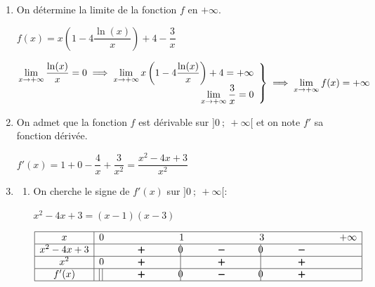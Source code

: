 \documentclass[10pt]{article}
\providecommand{\ds}{\displaystyle}
\begin{document}
\begin{enumerate}
\item On détermine la limite de la fonction $f$ en $+\infty$.

$f(x) = x\left ( 1- 4\dfrac{\ln(x)}{x}\right ) + 4 -  \dfrac{3}{x}$

$\left.
\begin{array}{@{} r}
\ds\lim_{x\to +\infty} \dfrac{\ln(x)}{x} = 0 \implies \ds\lim_{x\to +\infty}  x\left ( 1- 4\dfrac{\ln(x)}{x}\right ) + 4 = +\infty\\
\ds\lim_{x\to +\infty} \dfrac{3}{x}= 0
\end{array}
\right \rbrace
\implies
\ds\lim_{x\to +\infty} f(x) = +\infty$

\item On admet que la fonction $f$ est dérivable sur $]0~;~ +\infty[$ et on note $f'$ sa fonction dérivée.


$f'(x)= 1 + 0 - \dfrac{4}{x} +\dfrac{3}{x^2} = \dfrac{x^2 - 4x +3}{x^2}$

\item
	\begin{enumerate}
		\item 
		



On cherche le signe de $f'(x)$ sur $]0~;~+\infty[$:

$x^2-4x+3 = (x-1)(x-3)$

\begin{center}
{
\renewcommand{\arraystretch}{1.5}
\def\esp{\hspace*{2cm}}
$\begin{array}{|c | l *{6}{c} |} 
\hline
x  & 0 & \esp & 1 & \esp & 3 & \esp & +\infty \\
\hline
x^2-4x+3 &  & \pmb{+} &  \vline\hspace{-2.7pt}{0} & \pmb{-} & \vline\hspace{-2.7pt}{0} & \pmb{-} &\\
\hline
x^2 & 0  & \pmb{+} &  \vline\hspace{-2.7pt}{\phantom 0} & \pmb{+} & \vline\hspace{-2.7pt}{\phantom 0} & \pmb{+} &\\
\hline
f'(x) & \vline\;\vline  & \pmb{+} &  \vline\hspace{-2.7pt}{0} & \pmb{-} & \vline\hspace{-2.7pt}{0} & \pmb{+} & \\
\hline
\end{array}$
}
\end{center}


\end{enumerate}
\end{enumerate}
\end{document}
